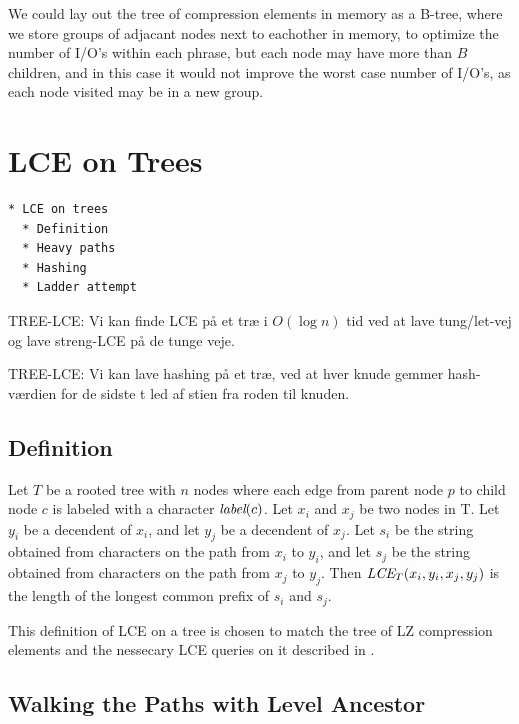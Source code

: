 \documentclass[a4]{article}
\newcommand*{\pref}{\prettyref}
\begin{document}
We could lay out the tree of compression elements in memory as a B-tree, where we store groups of adjacant nodes next to eachother in memory, to optimize the number of I/O's within each phrase, but each node may have more than $B$ children, and in this case it would not improve the worst case number of I/O's, as each node visited may be in a new group.

\section{LCE on Trees\label{sec:tree-lce}}

\begin{verbatim}
* LCE on trees
  * Definition
  * Heavy paths
  * Hashing
  * Ladder attempt
\end{verbatim}

TREE-LCE: Vi kan finde LCE på et træ i $O(\log n)$ tid ved at lave tung/let-vej og lave streng-LCE på de tunge veje.

TREE-LCE: Vi kan lave hashing på et træ, ved at hver knude gemmer hash-værdien for de sidste t led af stien fra roden til knuden.

\subsection{Definition}

Let $T$ be a rooted tree with $n$ nodes where each edge from parent node $p$ to child node $c$ is labeled with a character $\textit{label}(c)$. Let $x_i$ and $x_j$ be two nodes in T. Let $y_i$ be a decendent of $x_i$, and let $y_j$ be a decendent of $x_j$. Let $s_i$ be the string obtained from characters on the path from $x_i$ to $y_i$, and let $s_j$ be the string obtained from characters on the path from $x_j$ to $y_j$. Then $\textit{LCE}_T(x_i, y_i, x_j, y_j)$ is the length of the longest common prefix of $s_i$ and $s_j$.

This definition of LCE on a tree is chosen to match the tree of LZ compression elements and the nessecary LCE queries on it described in \pref{sec:lz-other}.

\subsection{Walking the Paths with Level Ancestor}
\end{document}
